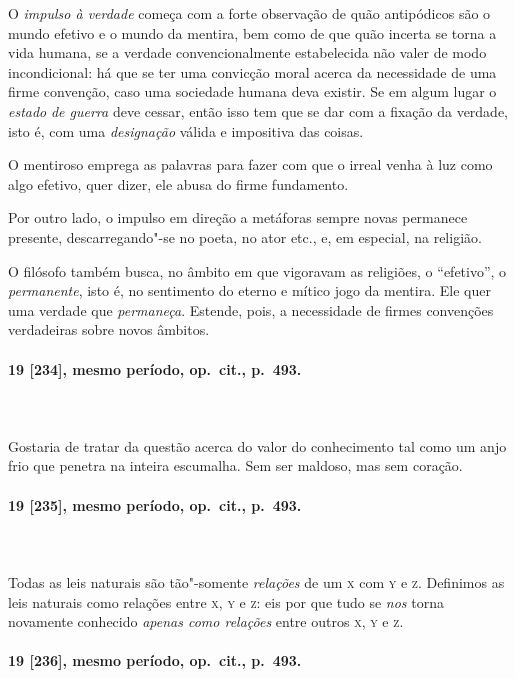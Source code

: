 O \textit{impulso à verdade} começa com a forte observação de quão
antipódicos são o mundo efetivo e o mundo da mentira, bem como de que
quão incerta se torna a vida humana, se a verdade convencionalmente
estabelecida não valer de modo incondicional: há que se ter uma
convicção moral acerca da necessidade de uma firme convenção, caso uma
sociedade humana deva existir. Se em algum lugar o \textit{estado}
\textit{de guerra} deve cessar, então isso tem que se dar com a fixação
da verdade, isto é, com uma \textit{designação} válida e impositiva das
coisas.

O mentiroso emprega as palavras para fazer com que o irreal venha à luz
como algo efetivo, quer dizer, ele abusa do firme fundamento.

Por outro lado, o impulso em direção a metáforas sempre novas permanece
presente, descarregando"-se no poeta, no ator etc., e, em especial, na
religião. 

O filósofo também busca, no âmbito em que vigoravam as religiões, o
“efetivo”, o \textit{permanente}, isto é, no sentimento do eterno e
mítico jogo da mentira. Ele quer uma verdade que \textit{permaneça}.
Estende, pois, a necessidade de firmes convenções verdadeiras sobre
novos âmbitos.

\pagebreak
\paragraph*{19 [234], mesmo período, op.~cit., p.~493.}
\ \\
\ \\

Gostaria de tratar da questão acerca do valor do conhecimento tal como
um anjo frio que penetra na inteira escumalha. Sem ser maldoso, mas sem
coração. 
\pagebreak
\paragraph*{19 [235], mesmo período, op.~cit., p.~493.}
\ \\
\ \\

Todas as leis naturais são tão"-somente \textit{relações} de um \textsc{x} com \textsc{y}
e \textsc{z}. Definimos as leis naturais como relações entre \textsc{x}, 
\textsc{y} e \textsc{z}: eis por
que tudo se \textit{nos} torna novamente conhecido \textit{apenas como
relações} entre outros \textsc{x}, \textsc{y} e \textsc{z}.

\pagebreak
\paragraph*{19 [236], mesmo período, op.~cit., p.~493.}
\ \\
\ \\

